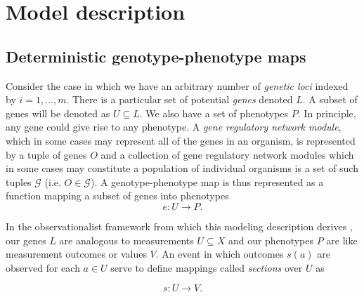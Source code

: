 \documentclass[10pt]{article}
\begin{document}
\section*{Model description}

\subsection*{Deterministic genotype-phenotype maps}
Consider the case in which we have an arbitrary number of \emph{genetic loci} indexed by $i=1, \ldots, m$. There is a particular set of potential \emph{genes} denoted $L$. A subset of genes will be denoted as $U \subseteq L$. We also have a set of phenotypes $P$. In principle, any gene could give rise to any phenotype. A \emph{gene regulatory network module}, which in some cases may represent all of the genes in an organism, is represented by a tuple of genes $O$ and a collection of gene regulatory network modules which in some cases may constitute a population of individual organisms is a set of such tuples $\mathcal{G}$ (i.e. $O \in \mathcal{G}$). A genotype-phenotype map is thus represented as a function mapping a subset of genes into phenotypes
$$
e \colon U \rightarrow  P.
$$

In the observationalist framework from which this modeling description derives \cite{Abramsky2011}, our genes $L$ are analogous to measurements $U \subseteq X$ and our phenotypes $P$ are like measurement outcomes or values $V$. An event in which outcomes $s(a)$ are observed for each $a \in U$ serve to define mappings called \emph{sections} over $U$ as

$$
s \colon U \rightarrow V.
$$
\end{document}
